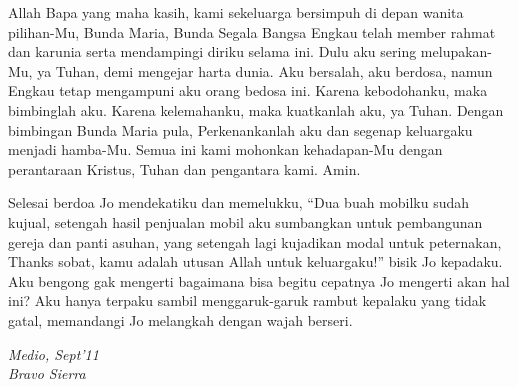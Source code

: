 	Allah Bapa yang maha kasih, kami sekeluarga bersimpuh di depan wanita pilihan-Mu, Bunda Maria, Bunda Segala Bangsa Engkau telah member rahmat dan karunia serta mendampingi diriku selama ini. Dulu aku sering melupakan-Mu, ya Tuhan, demi mengejar harta dunia. Aku bersalah, aku berdosa, namun Engkau tetap mengampuni aku orang bedosa ini. Karena kebodohanku, maka bimbinglah aku. Karena kelemahanku, maka kuatkanlah aku, ya Tuhan. Dengan bimbingan Bunda Maria pula, Perkenankanlah aku dan segenap keluargaku menjadi hamba-Mu. Semua ini kami mohonkan kehadapan-Mu dengan perantaraan Kristus, Tuhan dan pengantara kami. Amin.

	Selesai berdoa Jo mendekatiku dan memelukku, ``Dua buah mobilku sudah kujual, setengah hasil penjualan mobil aku sumbangkan untuk pembangunan gereja dan panti asuhan, yang setengah lagi kujadikan modal untuk peternakan, Thanks sobat, kamu adalah utusan Allah untuk keluargaku!'' bisik Jo kepadaku. Aku bengong gak mengerti bagaimana bisa begitu cepatnya Jo mengerti akan hal ini?  Aku hanya terpaku sambil menggaruk-garuk rambut kepalaku yang tidak gatal, memandangi Jo melangkah dengan wajah berseri.

\begin{flushright}
\textit{Medio, Sept’11\\
Bravo Sierra   
}\end{flushright}